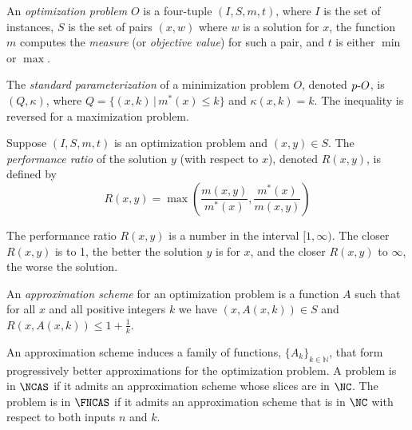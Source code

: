 \begin{definition}
  An \emph{optimization problem} $O$ is a four-tuple $(I, S, m, t)$, where $I$ is the set of instances, $S$ is the set of pairs $(x, w)$ where $w$ is a solution for $x$, the function $m$ computes the \emph{measure} (or \emph{objective value}) for such a pair, and $t$ is either $\min$ or $\max$.
\end{definition}

\begin{definition}\label{def:standard}
  The \emph{standard parameterization} of a minimization problem $O$, denoted $p\textnormal{-}{O}$, is $(Q, \kappa)$, where $Q = \{ (x, k) \, | \, m^*(x) \leq k \}$ and $\kappa(x, k) = k$.
  The inequality is reversed for a maximization problem.
\end{definition}

\begin{definition}
  Suppose $(I, S, m, t)$ is an optimization problem and $(x, y) \in S$.
  The \emph{performance ratio} of the solution $y$ (with respect to $x$), denoted $R(x, y)$, is defined by
  \[
  R(x, y) = \max \left(\frac{m(x, y)}{m^*(x)}, \frac{m^*(x)}{m(x, y)}\right)
  \]
\end{definition}

The performance ratio $R(x, y)$ is a number in the interval $[1, \infty)$.
The closer $R(x, y)$ is to 1, the better the solution $y$ is for $x$, and the closer $R(x, y)$ to $\infty$, the worse the solution.

\begin{definition}
  An \emph{approximation scheme} for an optimization problem is a function $A$ such that for all $x$ and all positive integers $k$ we have $(x, A(x, k)) \in S$ and $R(x, A(x, k)) \leq 1 + \frac{1}{k}$.
\end{definition}

An approximation scheme induces a family of functions, $\{A_k\}_{k \in \mathbb{N}}$, that form progressively better approximations for the optimization problem.
A problem is in $\NCAS$ if it admits an approximation scheme whose slices are in $\NC$.
The problem is in $\FNCAS$ if it admits an approximation scheme that is in $\NC$ with respect to both inputs $n$ and $k$.


